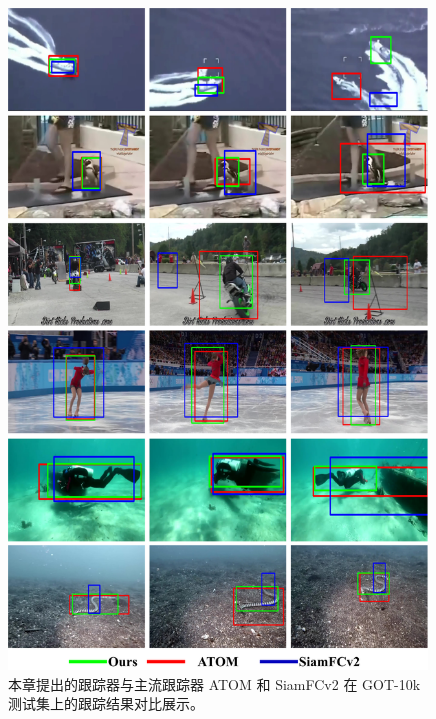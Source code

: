 \begin{figure}[p]
    \centering
    \includegraphics[width=0.99\textwidth]{Img/MTP/got10k/visulization.pdf}
    \caption{本章提出的跟踪器与主流跟踪器 ATOM \cite{danelljan2019atom} 和 SiamFCv2 \cite{SiamFC} 在 GOT-10k \cite{GOT-10k} 测试集上的跟踪结果对比展示。}
    \label{fig:MTP_vis}
\end{figure}

